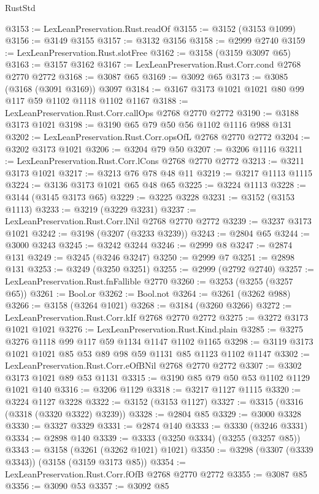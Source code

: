 \begin{lexlean}{RustStd}
\begin{coremodule}
{\begin{coremodule}
{{{{{{{{{{{{{{{{{{{{{{{{{{@3153 := LexLeanPreservation.Rust.readOf
@3155 := @3152 (@3153 @1099)
@3156 := @3149 @3155
@3157 := @3132 @3156
@3158 := @2999 @2740
@3159 := LexLeanPreservation.Rust.slotFree
@3162 := @3158 (@3159 @3097 @65)
@3163 := @3157 @3162
@3167 := LexLeanPreservation.Rust.Corr.cond @2768 @2770 @2772
@3168 := @3087 @65
@3169 := @3092 @65
@3173 := @3085 (@3168 (@3091 @3169)) @3097
@3184 := @3167 @3173 @1021 @1021 @80 @99 @117 @59 @1102 @1118 @1102 @1167
@3188 := LexLeanPreservation.Rust.Corr.callOps @2768 @2770 @2772
@3190 := @3188 @3173 @1021
@3198 := @3190 @65 @79 @50 @56 @1102 @1116 @988 @131
@3202 := LexLeanPreservation.Rust.Corr.opsOfL @2768 @2770 @2772
@3204 := @3202 @3173 @1021
@3206 := @3204 @79 @50
@3207 := @3206 @1116
@3211 := LexLeanPreservation.Rust.Corr.lCons @2768 @2770 @2772
@3213 := @3211 @3173 @1021
@3217 := @3213 @76 @78 @48 @11
@3219 := @3217 @1113 @1115
@3224 := @3136 @3173 @1021 @65 @48 @65
@3225 := @3224 @1113
@3228 := @3144 (@3145 @3173 @65)
@3229 := @3225 @3228
@3231 := @3152 (@3153 @1113)
@3233 := @3219 (@3229 @3231)
@3237 := LexLeanPreservation.Rust.Corr.lNil @2768 @2770 @2772
@3239 := @3237 @3173 @1021
@3242 := @3198 (@3207 (@3233 @3239))
@3243 := @2804 @65
@3244 := @3000 @3243
@3245 := @3242 @3244
@3246 := @2999 @8
@3247 := @2874 @131
@3249 := @3245 (@3246 @3247)
@3250 := @2999 @7
@3251 := @2898 @131
@3253 := @3249 (@3250 @3251)
@3255 := @2999 (@2792 @2740)
@3257 := LexLeanPreservation.Rust.fnFallible @2770
@3260 := @3253 (@3255 (@3257 @65))
@3261 := Bool.or
@3262 := Bool.not
@3264 := @3261 (@3262 @988)
@3266 := @3158 (@3264 @1021)
@3268 := @3184 (@3260 @3266)
@3272 := LexLeanPreservation.Rust.Corr.kIf @2768 @2770 @2772
@3275 := @3272 @3173 @1021 @1021
@3276 := LexLeanPreservation.Rust.Kind.plain
@3285 := @3275 @3276 @1118 @99 @117 @59 @1134 @1147 @1102 @1165
@3298 := @3119 @3173 @1021 @1021 @85 @53 @89 @98 @59 @1131 @85 @1123 @1102 @1147
@3302 := LexLeanPreservation.Rust.Corr.eOfBNil @2768 @2770 @2772
@3307 := @3302 @3173 @1021 @89 @53 @1131
@3315 := @3190 @85 @79 @50 @53 @1102 @1129 @1021 @140
@3316 := @3206 @1129
@3318 := @3217 @1127 @1115
@3320 := @3224 @1127 @3228
@3322 := @3152 (@3153 @1127)
@3327 := @3315 (@3316 (@3318 (@3320 @3322) @3239))
@3328 := @2804 @85
@3329 := @3000 @3328
@3330 := @3327 @3329
@3331 := @2874 @140
@3333 := @3330 (@3246 @3331)
@3334 := @2898 @140
@3339 := @3333 (@3250 @3334) (@3255 (@3257 @85))
@3343 := @3158 (@3261 (@3262 @1021) @1021)
@3350 := @3298 (@3307 (@3339 @3343)) (@3158 (@3159 @3173 @85))
@3354 := LexLeanPreservation.Rust.Corr.fOfB @2768 @2770 @2772
@3355 := @3087 @85
@3356 := @3090 @53
@3357 := @3092 @85
}}}}}}}}}}}}}}}}}}}}}}}}}}
\end{coremodule}}
\end{coremodule}
\end{lexlean}
